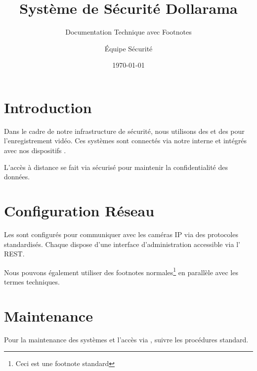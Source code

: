 \documentclass{dollarama}
\title{Système de Sécurité Dollarama}
\subtitle{Documentation Technique avec Footnotes}
\author{Équipe Sécurité}
\date{\today}
\begin{document}
\maketitle

\section{Introduction}

Dans le cadre de notre infrastructure de sécurité, nous utilisons des  et des  pour l'enregistrement vidéo. Ces systèmes sont connectés via notre  interne et intégrés avec nos dispositifs .

L'accès à distance se fait via  sécurisé pour maintenir la confidentialité des données.

\newpage

\section{Configuration Réseau}

Les  sont configurés pour communiquer avec les caméras IP via des protocoles standardisés. Chaque  dispose d'une interface d'administration accessible via l' REST.

Nous pouvons également utiliser des footnotes normales\footnote{Ceci est une footnote standard} en parallèle avec les termes techniques.

\newpage

\section{Maintenance}

Pour la maintenance des systèmes  et l'accès via , suivre les procédures standard.

\end{document}
